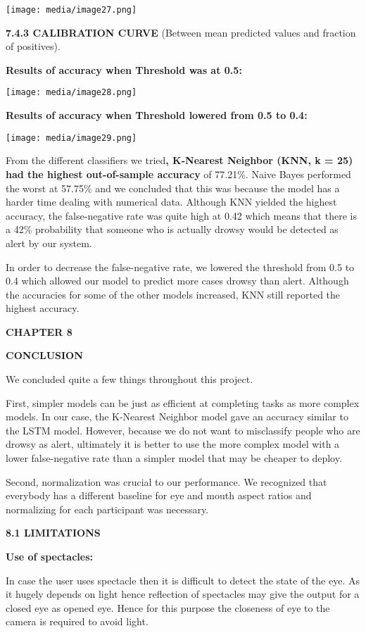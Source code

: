 \documentclass[a4paper,12pt]{article}
\begin{document}
\texttt{[image: media/image27.png]}

\textbf{7.4.3 CALIBRATION CURVE} (Between mean predicted values and
fraction of positives).

\textbf{Results of accuracy when Threshold was at 0.5:}

\texttt{[image: media/image28.png]}

\textbf{Results of accuracy when Threshold lowered from 0.5 to 0.4:}

\texttt{[image: media/image29.png]}

From the different classifiers we tried\textbf{, K-Nearest Neighbor
(KNN, k = 25) had the highest out-of-sample accuracy} of 77.21\%. Naive
Bayes performed the worst at 57.75\% and we concluded that this was
because the model has a harder time dealing with numerical data.
Although KNN yielded the highest accuracy, the false-negative rate was
quite high at 0.42 which means that there is a 42\% probability that
someone who is actually drowsy would be detected as alert by our system.

In order to decrease the false-negative rate, we lowered the threshold
from 0.5 to 0.4 which allowed our model to predict more cases drowsy
than alert. Although the accuracies for some of the other models
increased, KNN still reported the highest accuracy.

\textbf{CHAPTER 8}

\textbf{CONCLUSION}

We concluded quite a few things throughout this project.

First, simpler models can be just as efficient at completing tasks as
more complex models. In our case, the K-Nearest Neighbor model gave an
accuracy similar to the LSTM model. However, because we do not want to
misclassify people who are drowsy as alert, ultimately it is better to
use the more complex model with a lower false-negative rate than a
simpler model that may be cheaper to deploy.

Second, normalization was crucial to our performance. We recognized that
everybody has a different baseline for eye and mouth aspect ratios and
normalizing for each participant was necessary.

\textbf{8.1 LIMITATIONS}

\textbf{Use of spectacles:}

In case the user uses spectacle then it is difficult to detect the state
of the eye. As it hugely depends on light hence reflection of spectacles
may give the output for a closed eye as opened eye. Hence for this
purpose the closeness of eye to the camera is required to avoid light.
\end{document}
